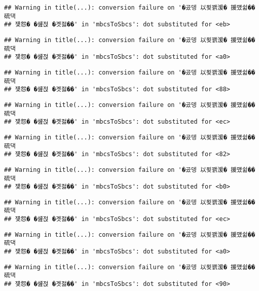 \documentclass[
]{article}
\begin{document}
\begin{verbatim}
## Warning in title(...): conversion failure on '�곴뎅 以묒꽭湲� 援먰쉶�� 硫댁
## 쟻怨� �섎젅 �곗젏��' in 'mbcsToSbcs': dot substituted for <eb>
\end{verbatim}

\begin{verbatim}
## Warning in title(...): conversion failure on '�곴뎅 以묒꽭湲� 援먰쉶�� 硫댁
## 쟻怨� �섎젅 �곗젏��' in 'mbcsToSbcs': dot substituted for <a0>
\end{verbatim}

\begin{verbatim}
## Warning in title(...): conversion failure on '�곴뎅 以묒꽭湲� 援먰쉶�� 硫댁
## 쟻怨� �섎젅 �곗젏��' in 'mbcsToSbcs': dot substituted for <88>
\end{verbatim}

\begin{verbatim}
## Warning in title(...): conversion failure on '�곴뎅 以묒꽭湲� 援먰쉶�� 硫댁
## 쟻怨� �섎젅 �곗젏��' in 'mbcsToSbcs': dot substituted for <ec>
\end{verbatim}

\begin{verbatim}
## Warning in title(...): conversion failure on '�곴뎅 以묒꽭湲� 援먰쉶�� 硫댁
## 쟻怨� �섎젅 �곗젏��' in 'mbcsToSbcs': dot substituted for <82>
\end{verbatim}

\begin{verbatim}
## Warning in title(...): conversion failure on '�곴뎅 以묒꽭湲� 援먰쉶�� 硫댁
## 쟻怨� �섎젅 �곗젏��' in 'mbcsToSbcs': dot substituted for <b0>
\end{verbatim}

\begin{verbatim}
## Warning in title(...): conversion failure on '�곴뎅 以묒꽭湲� 援먰쉶�� 硫댁
## 쟻怨� �섎젅 �곗젏��' in 'mbcsToSbcs': dot substituted for <ec>
\end{verbatim}

\begin{verbatim}
## Warning in title(...): conversion failure on '�곴뎅 以묒꽭湲� 援먰쉶�� 硫댁
## 쟻怨� �섎젅 �곗젏��' in 'mbcsToSbcs': dot substituted for <a0>
\end{verbatim}

\begin{verbatim}
## Warning in title(...): conversion failure on '�곴뎅 以묒꽭湲� 援먰쉶�� 硫댁
## 쟻怨� �섎젅 �곗젏��' in 'mbcsToSbcs': dot substituted for <90>
\end{verbatim}
\end{document}
